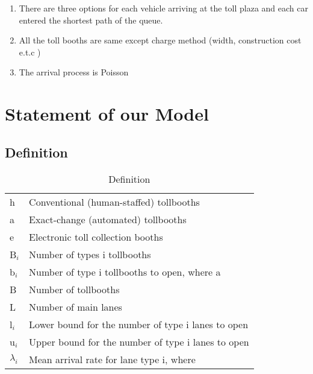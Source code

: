 \documentclass{mcmthesis}
\begin{document}
        \begin{enumerate}
          \item There are three options for each vehicle arriving at the toll plaza and each car entered the shortest path of the queue.
          \item All the toll booths are same except charge method (width, construction cost e.t.c )
          \item The arrival process is Poisson
        \end{enumerate}


\section{Statement of our Model}

    \subsection{Definition}
        \begin{table}
          \centering
                \begin{tabular}{ll}
                \hline
                h  &  Conventional (human-staffed) tollbooths \\
                a  &  Exact-change (automated) tollbooths \\
                e  &  Electronic toll collection booths \\
                B$_{i}$  &  Number of types i tollbooths \\
                b$_{i}$  &  Number of type i tollbooths to open, where a \\
                B  &  Number of tollbooths \\
                L  &  Number of main lanes \\
                l$_{i}$  &  Lower bound for the number of type i lanes to open \\
                u$_{i}$  &  Upper bound for the number of type i lanes to open \\
                $\lambda _{i}$ & Mean arrival rate for lane type i, where \\
                \hline
                \end{tabular}
            \caption{Definition}
        \end{table}
\end{document}
